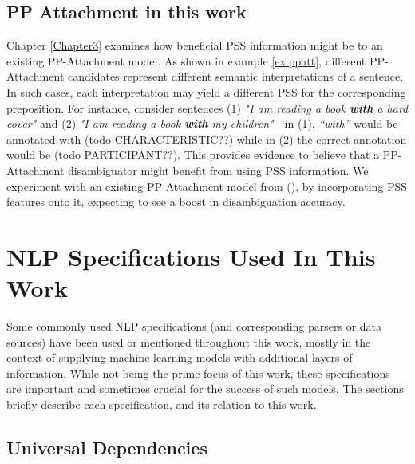 \subsection{PP Attachment in this work} \label{sec:ppatt_thiswork}

Chapter \ref{Chapter3} examines how beneficial PSS information might be to an existing PP-Attachment model. As shown in example \ref{ex:ppatt}, different PP-Attachment candidates represent different semantic interpretations of a sentence. In such cases, each interpretation may yield a different PSS for the corresponding preposition. For instance, consider sentences (1) \emph{"I am reading a book \textbf{with} a hard cover"} and (2) \emph{"I am reading a book \textbf{with} my children"} - in (1), \emph{“with”} would be annotated with (todo CHARACTERISTIC??) while in (2) the correct annotation would be (todo PARTICIPANT??). This provides evidence to believe that a PP-Attachment disambiguator might benefit from using PSS information. We experiment with an existing PP-Attachment model from (\cite{hpcd}), by incorporating PSS features onto it, expecting to see a boost in disambiguation accuracy.

\pagebreak

\section{NLP Specifications Used In This Work}

Some commonly used NLP specifications (and corresponding parsers or data sources) have been used or mentioned throughout this work, mostly in the context of supplying machine learning models with additional layers of information. While not being the prime focus of this work, these specifications are important and sometimes crucial for the success of such models. The sections briefly describe each specification, and its relation to this work. 

\subsection{Universal Dependencies}\label{sec:ud}


